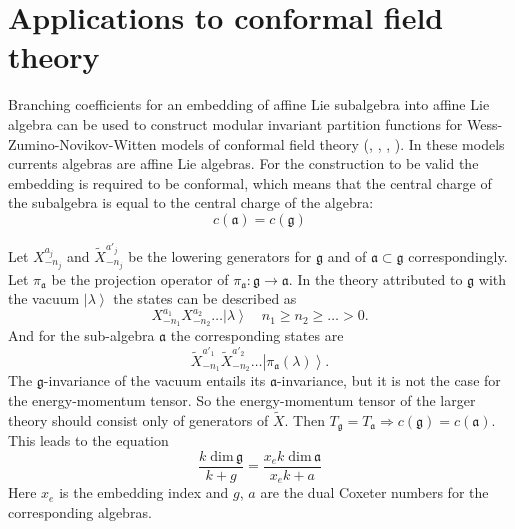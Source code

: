 \documentclass[a4paper,12pt]{article}
\theoremstyle{definition} \newtheorem{Def}{Definition}
\begin{document}
\section{Applications to conformal field theory}
\label{sec:phys-appl}

Branching coefficients for an embedding of affine Lie subalgebra into
affine Lie algebra can be used to construct modular invariant
partition functions for Wess-Zumino-Novikov-Witten models of conformal field theory (\cite{difrancesco1997cft}, \cite{Walton:1999xc}, \cite{walton1989conformal}, \cite{schellekens1986conformal}). In these models currents algebras are affine Lie algebras.  For the construction to be valid the embedding is required to be conformal, which means that the central charge of the subalgebra is equal to the central charge of the algebra:
\begin{equation}
  \label{eq:31}
  c(\mathfrak{a})=c(\mathfrak{g})
\end{equation}


Let $X^{a_j}_{-n_j}$ and $\tilde{X}^{a'_j}_{-n_j}$ be the lowering generators for $\mathfrak{g}$ and of $\mathfrak{a}\subset\mathfrak{g}$ correspondingly. Let $\pi_{\mathfrak{a}}$ be the projection operator of $\pi_{\mathfrak{a}}:\mathfrak{g}\longrightarrow \mathfrak{a}$. In the theory attributed to $\mathfrak{g}$ with the vacuum $\left|\lambda\right>$ the states can be described as 
\begin{equation}
  \label{eq:109}
  X^{a_1}_{-n_1}X^{a_2}_{-n_2}\dots\left|\lambda\right>\quad n_1\geq n_2\geq \dots>0.
\end{equation}
And for the sub-algebra $\mathfrak{a}$ the corresponding states are
\begin{equation}
  \label{eq:110}
  \tilde{X}^{a'_1}_{-n_1}\tilde{X}^{a'_2}_{-n_2}\dots\left|\pi_{\mathfrak{a}}(\lambda)\right>.
\end{equation}
The $\mathfrak{g}$-invariance of the vacuum entails its $\mathfrak{a}$-invariance, but it is not the case for the energy-momentum tensor. So the energy-momentum tensor of the larger theory should consist only of generators of $\tilde{X}$. Then $T_{\mathfrak{g}}=T_{\mathfrak{a}}\Rightarrow c(\mathfrak{g})=c(\mathfrak{a})$. This leads to the equation
\begin{equation}
  \label{eq:111}
  \frac{k\;\mathrm{dim}\,\mathfrak{g}}{k+g}=\frac{x_e k\; \mathrm{dim}\,\mathfrak{a}}{x_ek+a}
\end{equation}
Here $x_e$ is the embedding index and $g$, $a$ are the dual Coxeter numbers for the  corresponding algebras.
\end{document}
